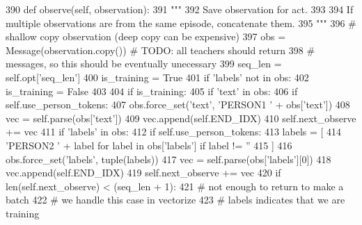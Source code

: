 \begin{DoxyCode}
390     \textcolor{keyword}{def }observe(self, observation):
391         \textcolor{stringliteral}{"""}
392 \textcolor{stringliteral}{        Save observation for act.}
393 \textcolor{stringliteral}{}
394 \textcolor{stringliteral}{        If multiple observations are from the same episode, concatenate them.}
395 \textcolor{stringliteral}{        """}
396         \textcolor{comment}{# shallow copy observation (deep copy can be expensive)}
397         obs = Message(observation.copy())  \textcolor{comment}{# TODO: all teachers should return}
398         \textcolor{comment}{# messages, so this should be eventually unecessary}
399         seq\_len = self.opt[\textcolor{stringliteral}{'seq\_len'}]
400         is\_training = \textcolor{keyword}{True}
401         \textcolor{keywordflow}{if} \textcolor{stringliteral}{'labels'} \textcolor{keywordflow}{not} \textcolor{keywordflow}{in} obs:
402             is\_training = \textcolor{keyword}{False}
403 
404         \textcolor{keywordflow}{if} is\_training:
405             \textcolor{keywordflow}{if} \textcolor{stringliteral}{'text'} \textcolor{keywordflow}{in} obs:
406                 \textcolor{keywordflow}{if} self.use\_person\_tokens:
407                     obs.force\_set(\textcolor{stringliteral}{'text'}, \textcolor{stringliteral}{'PERSON1 '} + obs[\textcolor{stringliteral}{'text'}])
408                 vec = self.parse(obs[\textcolor{stringliteral}{'text'}])
409                 vec.append(self.END\_IDX)
410                 self.next\_observe += vec
411             \textcolor{keywordflow}{if} \textcolor{stringliteral}{'labels'} \textcolor{keywordflow}{in} obs:
412                 \textcolor{keywordflow}{if} self.use\_person\_tokens:
413                     labels = [
414                         \textcolor{stringliteral}{'PERSON2 '} + label \textcolor{keywordflow}{for} label \textcolor{keywordflow}{in} obs[\textcolor{stringliteral}{'labels'}] \textcolor{keywordflow}{if} label != \textcolor{stringliteral}{''}
415                     ]
416                     obs.force\_set(\textcolor{stringliteral}{'labels'}, tuple(labels))
417                 vec = self.parse(obs[\textcolor{stringliteral}{'labels'}][0])
418                 vec.append(self.END\_IDX)
419                 self.next\_observe += vec
420             \textcolor{keywordflow}{if} len(self.next\_observe) < (seq\_len + 1):
421                 \textcolor{comment}{# not enough to return to make a batch}
422                 \textcolor{comment}{# we handle this case in vectorize}
423                 \textcolor{comment}{# labels indicates that we are training}

\end{DoxyCode}
